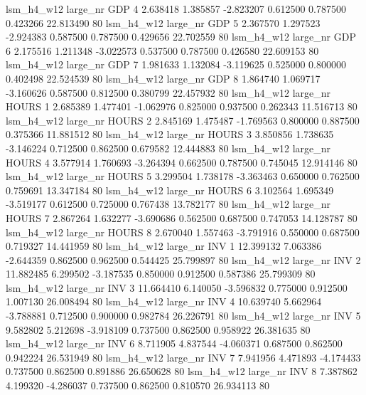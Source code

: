   lsm_h4_w12   large_nr      GDP                 4  2.638418  1.385857  -2.823207 0.612500 0.787500  0.423266   22.813490 80
  lsm_h4_w12   large_nr      GDP                 5  2.367570  1.297523  -2.924383 0.587500 0.787500  0.429656   22.702559 80
  lsm_h4_w12   large_nr      GDP                 6  2.175516  1.211348  -3.022573 0.537500 0.787500  0.426580   22.609153 80
  lsm_h4_w12   large_nr      GDP                 7  1.981633  1.132084  -3.119625 0.525000 0.800000  0.402498   22.524539 80
  lsm_h4_w12   large_nr      GDP                 8  1.864740  1.069717  -3.160626 0.587500 0.812500  0.380799   22.457932 80
  lsm_h4_w12   large_nr    HOURS                 1  2.685389  1.477401  -1.062976 0.825000 0.937500  0.262343   11.516713 80
  lsm_h4_w12   large_nr    HOURS                 2  2.845169  1.475487  -1.769563 0.800000 0.887500  0.375366   11.881512 80
  lsm_h4_w12   large_nr    HOURS                 3  3.850856  1.738635  -3.146224 0.712500 0.862500  0.679582   12.444883 80
  lsm_h4_w12   large_nr    HOURS                 4  3.577914  1.760693  -3.264394 0.662500 0.787500  0.745045   12.914146 80
  lsm_h4_w12   large_nr    HOURS                 5  3.299504  1.738178  -3.363463 0.650000 0.762500  0.759691   13.347184 80
  lsm_h4_w12   large_nr    HOURS                 6  3.102564  1.695349  -3.519177 0.612500 0.725000  0.767438   13.782177 80
  lsm_h4_w12   large_nr    HOURS                 7  2.867264  1.632277  -3.690686 0.562500 0.687500  0.747053   14.128787 80
  lsm_h4_w12   large_nr    HOURS                 8  2.670040  1.557463  -3.791916 0.550000 0.687500  0.719327   14.441959 80
  lsm_h4_w12   large_nr      INV                 1 12.399132  7.063386  -2.644359 0.862500 0.962500  0.544425   25.799897 80
  lsm_h4_w12   large_nr      INV                 2 11.882485  6.299502  -3.187535 0.850000 0.912500  0.587386   25.799309 80
  lsm_h4_w12   large_nr      INV                 3 11.664410  6.140050  -3.596832 0.775000 0.912500  1.007130   26.008494 80
  lsm_h4_w12   large_nr      INV                 4 10.639740  5.662964  -3.788881 0.712500 0.900000  0.982784   26.226791 80
  lsm_h4_w12   large_nr      INV                 5  9.582802  5.212698  -3.918109 0.737500 0.862500  0.958922   26.381635 80
  lsm_h4_w12   large_nr      INV                 6  8.711905  4.837544  -4.060371 0.687500 0.862500  0.942224   26.531949 80
  lsm_h4_w12   large_nr      INV                 7  7.941956  4.471893  -4.174433 0.737500 0.862500  0.891886   26.650628 80
  lsm_h4_w12   large_nr      INV                 8  7.387862  4.199320  -4.286037 0.737500 0.862500  0.810570   26.934113 80
